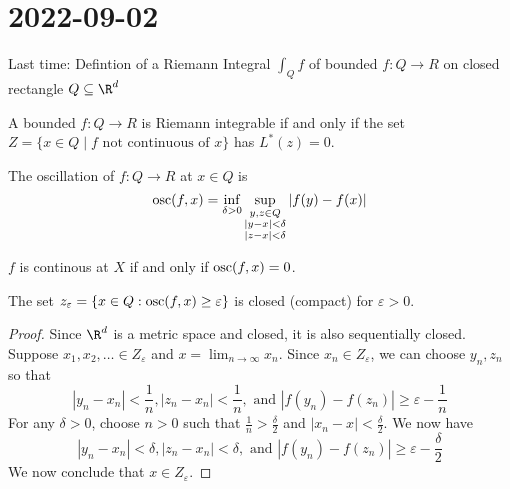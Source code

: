 \section{2022-09-02}

Last time: Defintion of a Riemann Integral $\int_Q f$ of bounded $f : Q \to R$ on closed rectangle $Q 
\subseteq \R^d$

\begin{theorem}
  A bounded $f : Q \to R$ is Riemann integrable if and only if the set $Z = \{ x \in Q \mid f
  \text{ not continuous of } x \}$ has $L^* (z) = 0$.
\end{theorem}

\begin{definition}[oscillation]
  The oscillation of $f : Q \to R$ at $x \in Q$ is 
\[\operatorname*{osc}(f,x) = \inf_{\delta > 0} \sup_{\substack{y, z \in Q \\ | y - x | < \delta \\ |z - x| < \delta}} |f(y) - f(x)| \]
\end{definition}

\begin{lemma}
  $f$ is continous at $X$ if and only if $\operatorname*{osc} (f,x) = 0$. 
\end{lemma}

\begin{lemma}
  The set $z_\varepsilon = \{ x \in Q : \operatorname*{osc}(f,x) \geq \varepsilon \}$ is closed (compact) for $\varepsilon > 0$.
\end{lemma}

\begin{proof}
  Since $\R^d$ is a metric space and closed, it is also sequentially closed.
  Suppose $x_1, x_2, \ldots \in Z_\varepsilon$ and $x = \lim_{n \to \infty} x_n$.
  Since $x_n \in Z_\varepsilon$, we can choose $y_n, z_n$ so that 
  \[|y_n - x_n| < \frac{1}{n}, |z_n - x_n| < \frac{1}{n}, \text{ and } |f(y_n) - f(z_n)| \geq \varepsilon - \frac{1}{n}\]
  For any $\delta > 0$, choose $n > 0$ such that $\frac{1}{n} > \frac{\delta}{2}$ and $|x_n - x| < \frac{\delta}{2}$. 
  We now have
  \[|y_n - x_n| < \delta, |z_n - x_n| < \delta, \text{ and } |f(y_n) - f(z_n)| \geq \varepsilon - \frac{\delta}{2}\]
  We now conclude that $x \in Z_\varepsilon$. 
\end{proof}



